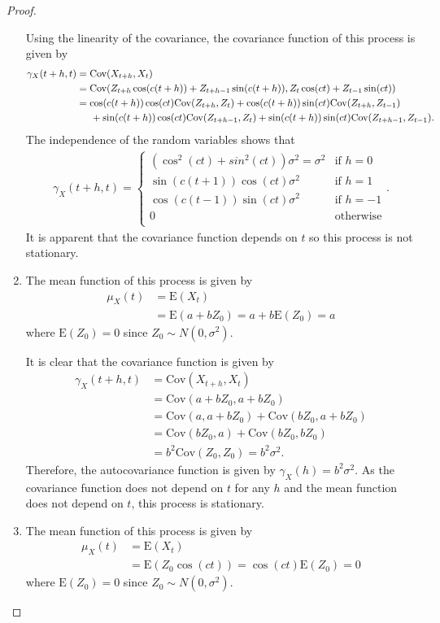 \documentclass[12pt]{article}
\theoremstyle{definition}
\newcommand{\E}{\text{E}}
\newcommand{\Co}[2]{\text{Cov}({#1}, {#2})}
\newcommand{\mx}[1][t]{\mu_X({#1})}
\newcommand{\gx}[2]{\gamma_X({#1}, {#2})}
\begin{document}
\begin{proof}
\begin{enumerate}
      Using the linearity of the covariance, the covariance function of this
      process is given by
      \begin{align*}
        \gx{t+h}{t} &= \Co{X_{t+h}}{X_t} \\
        &= \Co{Z_{t+h} \cos(c(t+h))+ Z_{t+h-1} \sin(c(t+h))} {Z_t \cos(ct)+ Z_{t-1} \sin(ct)} \\
        &= \cos(c(t+h))\cos(ct)\Co{Z_{t+h}}{Z_t} + \cos(c(t+h))\sin(ct)\Co{Z_{t+h}}{Z_{t-1}} \\
        & \hspace{5mm} + \sin(c(t+h))\cos(ct)\Co{Z_{t+h-1}}{Z_t} + \sin(c(t+h))\sin(ct)\Co{Z_{t+h-1}}{Z_{t-1}}.
      \end{align*}
      The independence of the random variables shows that
      \begin{align*}
        \gamma_X(t + h, t) =
        \begin{cases}
          (\cos^2(ct) + sin^2(ct))\sigma^2 = \sigma^2 & \text{if $h=0$} \\
          \sin(c(t+1))\cos(ct)\sigma^2 & \text{if $h=1$} \\
          \cos(c(t-1))\sin(ct)\sigma^2 & \text{if $h=-1$} \\
          0 & \text{otherwise} \\
        \end{cases}.
      \end{align*}
      It is apparent that the covariance function depends on $t$ so this process
      is not stationary.
    \item The mean function of this process is given by
      \begin{align*}
        \mx &= \E(X_t) \\
        &= \E(a + bZ_0) = a + b\E(Z_0) = a
      \end{align*}
      where $\E(Z_0) = 0$ since $Z_0 \sim N(0, \sigma^2)$.

      It is clear that the covariance function is given by
      \begin{align*}
        \gx{t+h}{t} &= \Co{X_{t+h}}{X_t} \\
        &= \Co{a + b Z_0}{a + b Z_0}\\
        &= \Co{a}{a + b Z_0} + \Co{b Z_0}{a + b Z_0} \\
        &= \Co{b Z_0}{a} + \Co{b Z_0}{b Z_0} \\
        &= b^2 \Co{Z_0}{Z_0} = b^2 \sigma^2.
      \end{align*}
      Therefore, the autocovariance function is given by $\gamma_X(h) = b^2 \sigma^2$.
      As the covariance function does not depend on $t$ for any $h$ and the mean
      function does not depend on $t$, this process is stationary.
    \item The mean function of this process is given by
      \begin{align*}
        \mx &= \E(X_t) \\
        &= \E(Z_0 \cos(ct)) = \cos(ct)\E(Z_0) = 0
      \end{align*}
      where $\E(Z_0) = 0$ since $Z_0 \sim N(0, \sigma^2)$.


\end{enumerate}
\end{proof}
\end{document}
